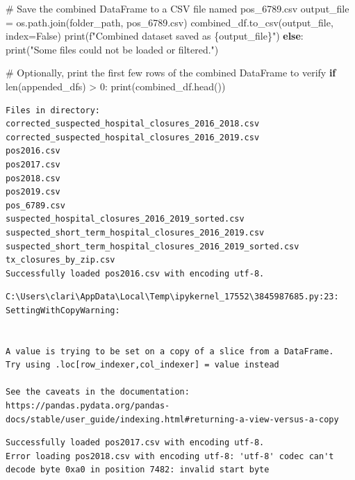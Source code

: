 \documentclass[
  letterpaper,
  DIV=11,
  numbers=noendperiod]{scrartcl}
\newenvironment{Shaded}{\begin{snugshade}}{\end{snugshade}}
\newcommand{\BuiltInTok}[1]{\textcolor[rgb]{0.00,0.23,0.31}{#1}}
\newcommand{\CommentTok}[1]{\textcolor[rgb]{0.37,0.37,0.37}{#1}}
\newcommand{\ControlFlowTok}[1]{\textcolor[rgb]{0.00,0.23,0.31}{\textbf{#1}}}
\newcommand{\DecValTok}[1]{\textcolor[rgb]{0.68,0.00,0.00}{#1}}
\newcommand{\NormalTok}[1]{\textcolor[rgb]{0.00,0.23,0.31}{#1}}
\newcommand{\OperatorTok}[1]{\textcolor[rgb]{0.37,0.37,0.37}{#1}}
\newcommand{\SpecialCharTok}[1]{\textcolor[rgb]{0.37,0.37,0.37}{#1}}
\newcommand{\SpecialStringTok}[1]{\textcolor[rgb]{0.13,0.47,0.30}{#1}}
\newcommand{\StringTok}[1]{\textcolor[rgb]{0.13,0.47,0.30}{#1}}
\newcommand{\VariableTok}[1]{\textcolor[rgb]{0.07,0.07,0.07}{#1}}
\begin{document}
\begin{Shaded}
\begin{Highlighting}[]
    \CommentTok{\# Save the combined DataFrame to a CSV file named \textquotesingle{}pos\_6789.csv\textquotesingle{}}
\NormalTok{    output\_file }\OperatorTok{=}\NormalTok{ os.path.join(folder\_path, }\StringTok{\textquotesingle{}pos\_6789.csv\textquotesingle{}}\NormalTok{)}
\NormalTok{    combined\_df.to\_csv(output\_file, index}\OperatorTok{=}\VariableTok{False}\NormalTok{)}
    \BuiltInTok{print}\NormalTok{(}\SpecialStringTok{f"Combined dataset saved as }\SpecialCharTok{\{}\NormalTok{output\_file}\SpecialCharTok{\}}\SpecialStringTok{"}\NormalTok{)}
\ControlFlowTok{else}\NormalTok{:}
    \BuiltInTok{print}\NormalTok{(}\StringTok{"Some files could not be loaded or filtered."}\NormalTok{)}

\CommentTok{\# Optionally, print the first few rows of the combined DataFrame to verify}
\ControlFlowTok{if} \BuiltInTok{len}\NormalTok{(appended\_dfs) }\OperatorTok{\textgreater{}} \DecValTok{0}\NormalTok{:}
    \BuiltInTok{print}\NormalTok{(combined\_df.head())}
\end{Highlighting}
\end{Shaded}

\begin{verbatim}
Files in directory:
corrected_suspected_hospital_closures_2016_2018.csv
corrected_suspected_hospital_closures_2016_2019.csv
pos2016.csv
pos2017.csv
pos2018.csv
pos2019.csv
pos_6789.csv
suspected_hospital_closures_2016_2019_sorted.csv
suspected_short_term_hospital_closures_2016_2019.csv
suspected_short_term_hospital_closures_2016_2019_sorted.csv
tx_closures_by_zip.csv
Successfully loaded pos2016.csv with encoding utf-8.
\end{verbatim}

\begin{verbatim}
C:\Users\clari\AppData\Local\Temp\ipykernel_17552\3845987685.py:23: SettingWithCopyWarning:


A value is trying to be set on a copy of a slice from a DataFrame.
Try using .loc[row_indexer,col_indexer] = value instead

See the caveats in the documentation: https://pandas.pydata.org/pandas-docs/stable/user_guide/indexing.html#returning-a-view-versus-a-copy
\end{verbatim}

\begin{verbatim}
Successfully loaded pos2017.csv with encoding utf-8.
Error loading pos2018.csv with encoding utf-8: 'utf-8' codec can't decode byte 0xa0 in position 7482: invalid start byte
\end{verbatim}
\end{document}
